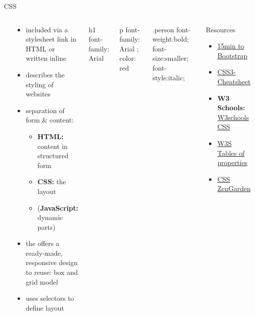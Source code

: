\begin{frame}[fragile]{CSS}
\footnotesize
{}
\begin{columns}
\\
\\
\begin{block}{}
\begin{itemize}
    \item included via a stylesheet link in HTML or written inline
    \item describes the styling of websites 
    \item separation of form \& content: 
    \begin{itemize}\scriptsize
        \item \textbf{HTML:} content in structured form
        \item \textbf{CSS:} the layout
        \item (\textbf{JavaScript:} dynamic parts)
    \end{itemize}
    \item the  offers a ready-made, responsive design to reuse: box and grid model
    \item uses selectors to define layout
\end{itemize}
\end{block}

\begin{csscode}
h1 {
font-family: Arial
}
\end{csscode}


\begin{csscode}
p {
font-family: Arial ;
color: red
}
\end{csscode}

\begin{csscode}
.person {
    font-weight:bold;
    font-size:smaller;
    font-style:italic;
}
\end{csscode}

\begin{block}{Resources}
\begin{itemize}\scriptsize
    \item \href{https://tutorialzine.com/2015/10/learn-the-bootstrap-grid-in-15-minutes}{15min to Bootstrap}
    \item \href{http://www.smashingmagazine.com/wp-content/uploads/images/css3-cheat-sheet/css3-cheat-sheet.pdf}{CSS3-Cheatsheet}
    \item \textbf{W3 Schools:} \href{http://www.w3schools.com/css/}{W3schools CSS} 
    \item \href{http://www.w3.org/TR/CSS21/propidx.html}{W3S Tables of properties}
    \item \href{http://www.csszengarden.com}{CSS ZenGarden}
\end{itemize}
\end{block}

\end{columns}

\end{frame}

